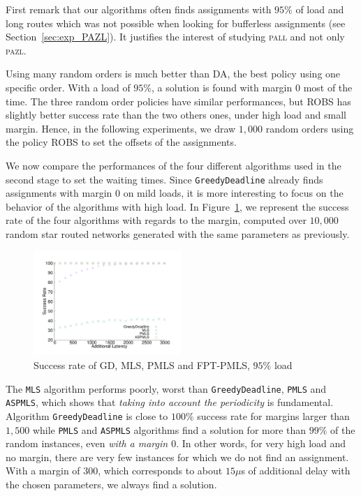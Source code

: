 \documentclass[a4paper,10pt]{article}
\newcommand\greedydeadline{\texttt{GreedyDeadline}\xspace}
\newcommand\MLS{\texttt{MLS}\xspace}
\newcommand\PMLS{\texttt{PMLS}\xspace}
\newcommand\ASPMLS{\texttt{ASPMLS}\xspace}
\newcommand\pazl{\textsc{pazl}\xspace}
\newcommand\pall{\textsc{pall}\xspace}
\begin{document}
  First remark that our algorithms often finds assignments with $95\%$ of load and long routes which was not possible when looking for bufferless assignments (see Section~\ref{sec:exp_PAZL}). It justifies the interest of studying \pall and not only \pazl.
  
     Using many random orders is much better than DA, the best policy using one specific order. 
     With a load of $95\%$, a solution is found with margin $0$ most of the time. The three random order policies have similar performances, but ROBS has slightly better success rate than the two others ones, under high load and small margin. Hence, in the following experiments, we draw $1,000$ random orders using the policy ROBS to set the offsets of the assignments.
     
      We now compare the performances of the four different algorithms used in the second stage to set the waiting times. Since \greedydeadline already finds assignments with margin $0$ on mild loads, it is more interesting to focus on the behavior of the algorithms with high load. In Figure~\ref{fig:success21000}, we represent the success rate of the four algorithms with regards to the margin,  computed over $10,000$ random star routed networks generated with the same parameters as previously. 
     
    \begin{figure} [h] 
       \begin{center}
      \includegraphics[width=0.5\textwidth]{retour_21000.pdf}
      \end{center}
      \caption{Success rate of GD, MLS, PMLS and FPT-PMLS, $95\%$ load}
     \label{fig:success21000}
     \end{figure}
     
      The \MLS algorithm performs poorly, worst than \greedydeadline, \PMLS and \ASPMLS, which shows that \emph{taking into account the periodicity} is fundamental.
     Algorithm \greedydeadline is close to $100\%$ success rate for margins larger than $1,500$ while  \PMLS and \ASPMLS algorithms find a solution for more than $99\%$ of the random instances, even \emph{with a margin $0$}. In other words, for very high load and no margin, there are very few instances for which we do not find an assignment. With a margin of $300$, which corresponds to about $15\mu$s of additional delay with the chosen parameters, we always find a solution. 
     
\end{document}
